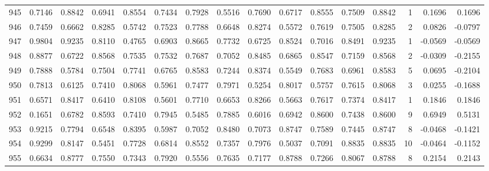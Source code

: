\begin{tabular}{lrrrrrrrrrrrrrrr}
945 &      0.7146 &  0.8842 &  0.6941 &  0.8554 &  0.7434 &  0.7928 &  0.5516 &  0.7690 &  0.6717 &  0.8555 &   0.7509 &     0.8842 &      1 &                    0.1696 &                     0.1696 \\
946 &      0.7459 &  0.6662 &  0.8285 &  0.5742 &  0.7523 &  0.7788 &  0.6648 &  0.8274 &  0.5572 &  0.7619 &   0.7505 &     0.8285 &      2 &                    0.0826 &                    -0.0797 \\
947 &      0.9804 &  0.9235 &  0.8110 &  0.4765 &  0.6903 &  0.8665 &  0.7732 &  0.6725 &  0.8524 &  0.7016 &   0.8491 &     0.9235 &      1 &                   -0.0569 &                    -0.0569 \\
948 &      0.8877 &  0.6722 &  0.8568 &  0.7535 &  0.7532 &  0.7687 &  0.7052 &  0.8485 &  0.6865 &  0.8547 &   0.7159 &     0.8568 &      2 &                   -0.0309 &                    -0.2155 \\
949 &      0.7888 &  0.5784 &  0.7504 &  0.7741 &  0.6765 &  0.8583 &  0.7244 &  0.8374 &  0.5549 &  0.7683 &   0.6961 &     0.8583 &      5 &                    0.0695 &                    -0.2104 \\
950 &      0.7813 &  0.6125 &  0.7410 &  0.8068 &  0.5961 &  0.7477 &  0.7971 &  0.5254 &  0.8017 &  0.5757 &   0.7615 &     0.8068 &      3 &                    0.0255 &                    -0.1688 \\
951 &      0.6571 &  0.8417 &  0.6410 &  0.8108 &  0.5601 &  0.7710 &  0.6653 &  0.8266 &  0.5663 &  0.7617 &   0.7374 &     0.8417 &      1 &                    0.1846 &                     0.1846 \\
952 &      0.1651 &  0.6782 &  0.8593 &  0.7410 &  0.7945 &  0.5485 &  0.7885 &  0.6016 &  0.6942 &  0.8600 &   0.7438 &     0.8600 &      9 &                    0.6949 &                     0.5131 \\
953 &      0.9215 &  0.7794 &  0.6548 &  0.8395 &  0.5987 &  0.7052 &  0.8480 &  0.7073 &  0.8747 &  0.7589 &   0.7445 &     0.8747 &      8 &                   -0.0468 &                    -0.1421 \\
954 &      0.9299 &  0.8147 &  0.5451 &  0.7728 &  0.6814 &  0.8552 &  0.7357 &  0.7976 &  0.5037 &  0.7091 &   0.8835 &     0.8835 &     10 &                   -0.0464 &                    -0.1152 \\
955 &      0.6634 &  0.8777 &  0.7550 &  0.7343 &  0.7920 &  0.5556 &  0.7635 &  0.7177 &  0.8788 &  0.7266 &   0.8067 &     0.8788 &      8 &                    0.2154 &                     0.2143 \\

\end{tabular}
